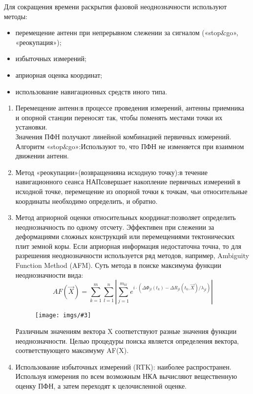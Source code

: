 \documentclass[14pt,a4paper,oneside]{extarticle}
\newcommand{\pic}[3]{
	\begin{figure}[#1]
		\begin{center}
			\texttt{[image: imgs/\#3]}
		\end{center}
	\end{figure}
}
\begin{document}
Для сокращения времени раскрытия фазовой неоднозначности используют методы:

\begin{itemize}
    \item перемещение антенн при непрерывном слежении за сигналом («stop\&go», «реокупация»);
    \item избыточных измерений;
    \item априорная оценка координат;
    \item использование навигационных средств иного типа.
\end{itemize}

\begin{enumerate}
    \item Перемещение антенн:в процессе проведения измерений, антенны приемника и опорной станции переносят так, чтобы поменять местами точки их установки.\\
          Значения ПФН получают линейной комбинацией первичных измерений.\\
          Алгоритм «stop\&go»:Используют то, что ПФН не изменяется при взаимном движении антенн.
    \item Метод «реокупации»(возвращенияна исходную точку):в течение навигационного сеанса НАПсовершает накопление первичных измерений в исходной точке, перемещение из опорной точки к точкам, чьи относительные координаты необходимо определить, и обратно.
    \item Метод априорной оценки относительных координат:позволяет определить неоднозначность по одному отсчету. Эффективен при слежении за деформациями сложных конструкций или перемещениями тектонических плит земной коры. Если априорная информация недостаточна точна, то для разрешения неоднозначности используется ряд методов, например, Ambiguity Function Method (AFM). Суть метода в поиске максимума функции неоднозначности вида: \[AF(\vec{X})=\sum_{k=1}^{m}\sum_{l=1}^{n}\left|\sum_{j=1}^{m_{kl}}e^{i\cdot\left(\Delta\Phi_{jl}(t_k)-\Delta R_{jl}(t_k,\vec{X})/\lambda_{jl}\right)}\right|\] \pic{H}{\textwidth}{10} Различным значениям вектора X соответствуют разные значения функции неоднозначности. Целью процедуры поиска является определения вектора, соответствующего максимуму AF(X).
    \item Использование избыточных измерений (RTK): наиболее распространен. Используя измерения по всем возможным НКА вычисляют вещественную оценку ПФН, а затем переходят к целочисленной оценке.
\end{enumerate}
\end{document}
